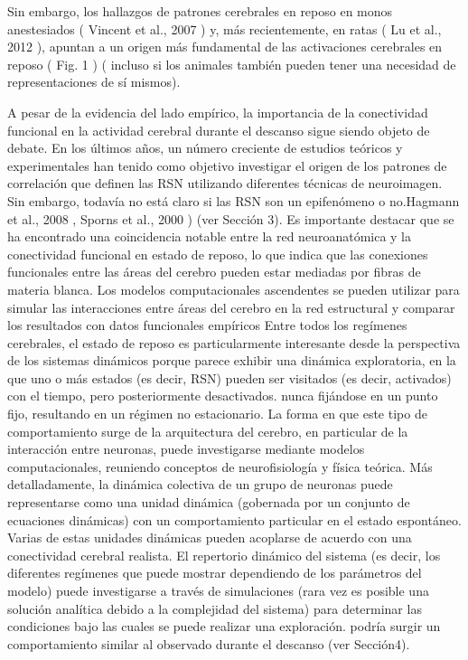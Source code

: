 Sin embargo, los hallazgos de patrones cerebrales en reposo en monos anestesiados ( Vincent et al., 2007 ) y, más recientemente, en ratas ( Lu et al., 2012 ), apuntan a un origen más fundamental de las activaciones cerebrales en reposo ( Fig. 1 ) ( incluso si los animales también pueden tener una necesidad de representaciones de sí mismos). 
 
 
  A pesar de la evidencia del lado empírico, la importancia de la conectividad funcional en la actividad cerebral durante el descanso sigue siendo objeto de debate. En los últimos años, un número creciente de estudios teóricos y experimentales han tenido como objetivo investigar el origen de los patrones de correlación que definen las RSN utilizando diferentes técnicas de neuroimagen. Sin embargo, todavía no está claro si las RSN son un epifenómeno o no.Hagmann et al., 2008 , Sporns et al., 2000 ) (ver Sección 3). Es importante destacar que se ha encontrado una coincidencia notable entre la red neuroanatómica y la conectividad funcional en estado de reposo, lo que indica que las conexiones funcionales entre las áreas del cerebro pueden estar mediadas por fibras de materia blanca. Los modelos computacionales ascendentes se pueden utilizar para simular las interacciones entre áreas del cerebro en la red estructural y comparar los resultados con datos funcionales empíricos
  Entre todos los regímenes cerebrales, el estado de reposo es particularmente interesante desde la perspectiva de los sistemas dinámicos porque parece exhibir una dinámica exploratoria, en la que uno o más estados (es decir, RSN) pueden ser visitados (es decir, activados) con el tiempo, pero posteriormente desactivados. nunca fijándose en un punto fijo, resultando en un régimen no estacionario. La forma en que este tipo de comportamiento surge de la arquitectura del cerebro, en particular de la interacción entre neuronas, puede investigarse mediante modelos computacionales, reuniendo conceptos de neurofisiología y física teórica. Más detalladamente, la dinámica colectiva de un grupo de neuronas puede representarse como una unidad dinámica (gobernada por un conjunto de ecuaciones dinámicas) con un comportamiento particular en el estado espontáneo. Varias de estas unidades dinámicas pueden acoplarse de acuerdo con una conectividad cerebral realista. El repertorio dinámico del sistema (es decir, los diferentes regímenes que puede mostrar dependiendo de los parámetros del modelo) puede investigarse a través de simulaciones (rara vez es posible una solución analítica debido a la complejidad del sistema) para determinar las condiciones bajo las cuales se puede realizar una exploración. podría surgir un comportamiento similar al observado durante el descanso (ver Sección4).
  
  
  